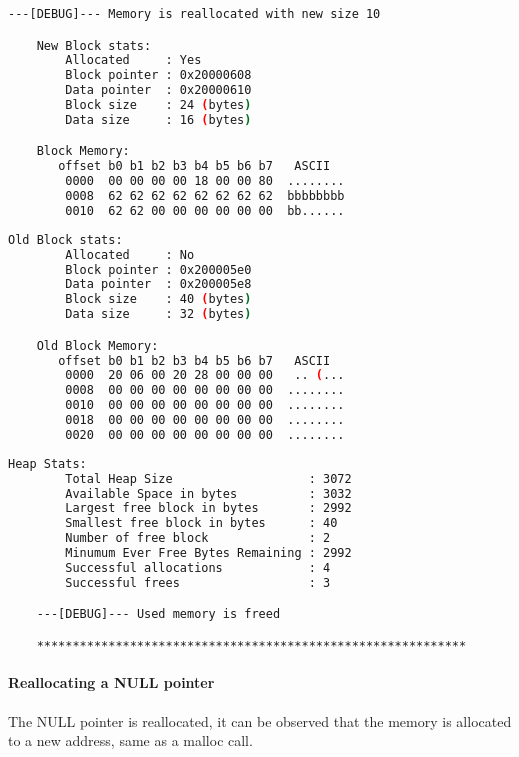    \begin{outputbox}
    \begin{lstlisting}[language=bash]
    ---[DEBUG]--- Memory is reallocated with new size 10

    New Block stats:
        Allocated     : Yes
        Block pointer : 0x20000608
        Data pointer  : 0x20000610
        Block size    : 24 (bytes)
        Data size     : 16 (bytes)

    Block Memory:
       offset b0 b1 b2 b3 b4 b5 b6 b7   ASCII
        0000  00 00 00 00 18 00 00 80  ........
        0008  62 62 62 62 62 62 62 62  bbbbbbbb
        0010  62 62 00 00 00 00 00 00  bb......
    \end{lstlisting}
    \end{outputbox}

    \begin{outputbox}
    \begin{lstlisting}[language=bash]
    Old Block stats:
        Allocated     : No
        Block pointer : 0x200005e0
        Data pointer  : 0x200005e8
        Block size    : 40 (bytes)
        Data size     : 32 (bytes)

    Old Block Memory:
       offset b0 b1 b2 b3 b4 b5 b6 b7   ASCII
        0000  20 06 00 20 28 00 00 00   .. (...
        0008  00 00 00 00 00 00 00 00  ........
        0010  00 00 00 00 00 00 00 00  ........
        0018  00 00 00 00 00 00 00 00  ........
        0020  00 00 00 00 00 00 00 00  ........
    \end{lstlisting}
    \end{outputbox}

    \begin{outputbox}
    \begin{lstlisting}[language=bash]
    Heap Stats:
        Total Heap Size                   : 3072
        Available Space in bytes          : 3032
        Largest free block in bytes       : 2992
        Smallest free block in bytes      : 40
        Number of free block              : 2
        Minumum Ever Free Bytes Remaining : 2992
        Successful allocations            : 4
        Successful frees                  : 3

    ---[DEBUG]--- Used memory is freed

    ************************************************************
    \end{lstlisting}
    \end{outputbox}

    \paragraph{Reallocating a NULL pointer}
    The NULL pointer is reallocated, it can be observed that the memory is allocated to a new address, same as a malloc call.

